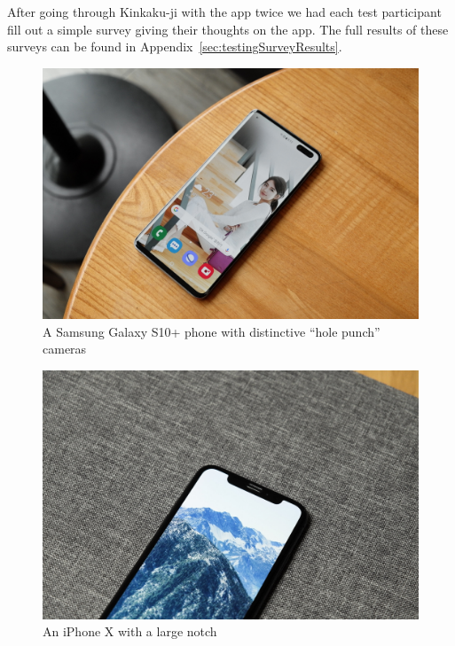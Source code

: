 \documentclass[a4paper, 10pt, american, titlepage]{article}
\begin{document}
After going through Kinkaku-ji with the app twice we had each test participant
fill out a simple survey giving their thoughts on the app. The full results of
these surveys can be found in Appendix~\ref{sec:testingSurveyResults}.

\begin{figure}[h]
	\centering
	\includegraphics[width=\textwidth]{galaxy-s10+.jpg}
	\caption[A Samsung Galaxy S10+ phone with distinctive ``hole punch''
	cameras]{A Samsung Galaxy S10+ phone with distinctive ``hole punch''
		cameras~\autocite{yoo2019}}
	\label{fig:galaxyS10Plus}
\end{figure}

\begin{figure}[h]
	\centering
	\includegraphics[width=\textwidth]{iphone-x.jpg}
	\caption[An iPhone X with a large notch]{An iPhone X with a large
		notch~\autocite{yoo2017}}
	\label{fig:iPhoneX}
\end{figure}
\end{document}
